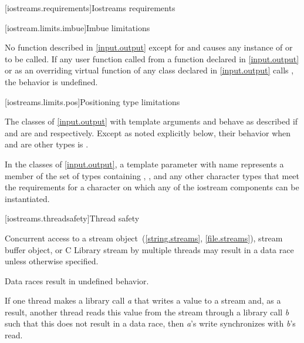 [iostreams.requirements]{Iostreams requirements}

[iostream.limits.imbue]{Imbue limitations}

\pnum
No function described in \ref{input.output} except for
and 
causes any instance of
or
to be called.
If any user function called from a function declared in \ref{input.output} or
as an overriding virtual function of any class declared in \ref{input.output}
calls
,
the behavior is undefined.

[iostreams.limits.pos]{Positioning type limitations}

\pnum
The classes of \ref{input.output} with template arguments
and
behave as described if
and
are
and
respectively.
Except as noted explicitly below, their behavior when
and
are other types is
.

\pnum
In the classes of \ref{input.output}, a template parameter with name
 represents a member of the set of types containing , ,
and any other 
character types that meet the requirements for a character on which any of
the iostream components can be instantiated.

[iostreams.threadsafety]{Thread safety}

\pnum
Concurrent access to a stream object~(\ref{string.streams}, \ref{file.streams}), stream buffer
object, or C Library stream by multiple threads may result in
a data race unless otherwise specified.
\begin{note}
Data races result in undefined behavior.
\end{note}

\pnum
If one thread makes a library call \textit{a} that writes a value to a stream
and, as a result, another thread reads this value from the stream through a
library call \textit{b} such that this does not result in a data race, then
\textit{a}'s write synchronizes with
\textit{b}'s read.

